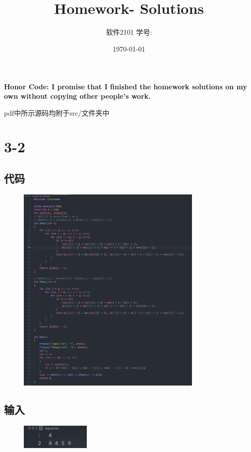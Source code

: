 \documentclass[11pt]{article}  %
\title{\vspace{-4cm}\CourseCodeName \space
        \Session \protect\\  Homework-\textbf{\Homework} Solutions}
\author{软件2101 \Name \space 学号: \SID}
\date{\today}
\begin{document}
\maketitle

\textbf{Honor Code: I promise that I finished the homework solutions on my own without copying other people's 
    work.}

pdf中所示源码均附于src/文件夹中

\section*{3-2}

\subsection*{代码}

    \begin{figure}[H]
        \centering
        \includegraphics[width = 0.8\textwidth]{pic/3-2.png}
    \end{figure}

\subsection*{输入}

    \begin{figure}[H]
        \centering
        \includegraphics[width = 0.3\textwidth]{pic/3-2in.png}
    \end{figure}
\end{document}
